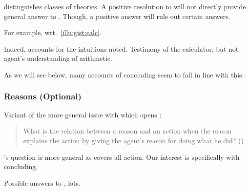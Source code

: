 \begin{note}
  \issueInclusion{} distinguishes classes of theories.
  A positive resolution to \issueInclusion{} will not directly provide general answer to \qWhy{}.
  Though, a positive answer will rule out certain answers.

  For example, wrt.~\autoref{illu:gist:calc}.

  Indeed, accounts for the intuitions noted.
  Testimony of the calculator, but not agent's understanding of arithmetic.

  As we will see below, many accounts of concluding seem to fall in line with this.
\end{note}

\subsubsection{Reasons (Optional)}

\begin{note}

\end{note}

\begin{note}
  Variant of the more general issue with which \citeauthor{Davidson:1963aa} opens :

  \begin{quote}
    What is the relation between a reason and an action when the reason explains the action by giving the agent’s reason for doing what he did?%
    \mbox{}\hfill\mbox{(\citeyear[685]{Davidson:1963aa})}
  \end{quote}

  \citeauthor{Davidson:1963aa}'s question is more general as covers all action.
  Our interest is specifically with concluding.

  Possible answers to \qWhy{}, lots.
\end{note}

